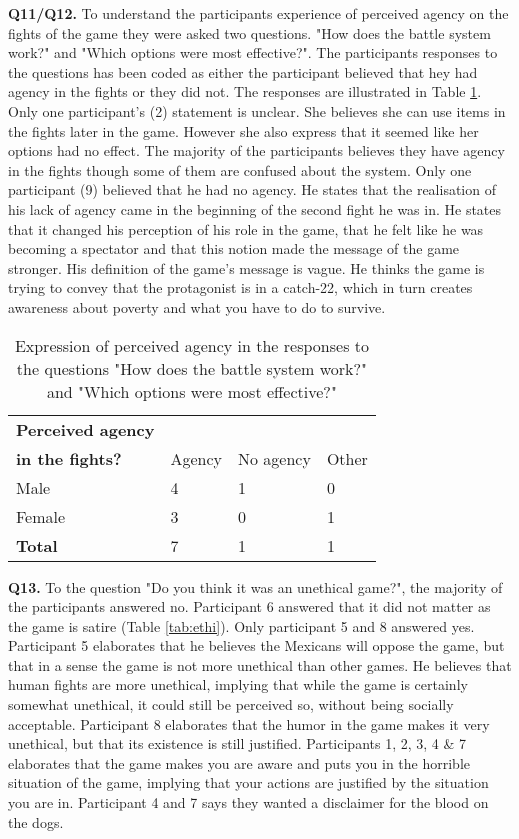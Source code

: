 \textbf{Q11/Q12.} To understand the participants experience of perceived agency on the fights of the game they were asked two questions. "How does the battle system work?" and "Which options were most effective?". The participants responses to the questions has been coded as either the participant believed that hey had agency in the fights or they did not. The responses are illustrated in Table \ref{tab:agen}. Only one participant's (2) statement is unclear. She believes she can use items in the fights later in the game. However she also express that it seemed like her options had no effect. The majority of the participants believes they have agency in the fights though some of them are confused about the system. Only one participant (9) believed that he had no agency. He states that the realisation of his lack of agency came in the beginning of the second fight he was in. He states that it changed his perception of his role in the game, that he felt like he was becoming a spectator and that this notion made the message of the game stronger. His definition of the game's message is vague. He thinks the game is trying to convey that the protagonist is in a catch-22, which in turn creates awareness about poverty and what you have to do  to survive.

\begin{table}[h]
\centering
\begin{tabular}{l l l l}
\hline
\textbf{Perceived agency}\\
\textbf{in the fights?} & Agency & No agency & Other \\
\hline
Male & 4 & 1 & 0 \\
Female & 3 & 0 & 1 \\
\textbf{Total} & 7 & 1 & 1 \\
\hline
\end{tabular}
\caption{\label{tab:agen}Expression of perceived agency in the responses to the questions "How does the battle system work?" and "Which options were most effective?"}
\end{table}

\textbf{Q13.} To the question "Do you think it was an unethical game?", the majority of the participants answered no. Participant 6 answered that it did not matter as the game is satire (Table \ref{tab:ethi}). Only participant 5 and 8 answered yes. Participant 5 elaborates that he believes the Mexicans will oppose the game, but that in a sense the game is not more unethical than other games. He believes that human fights are more unethical, implying that while the game is certainly somewhat unethical, it could still be perceived so, without being socially acceptable. Participant 8 elaborates that the humor in the game makes it very unethical, but that its existence is still justified. Participants 1, 2, 3, 4 & 7 elaborates that the game makes you are aware and puts you in the horrible situation of the game, implying that your actions are justified by the situation you are in. Participant 4 and 7 says they wanted a disclaimer for the blood on the dogs.\

